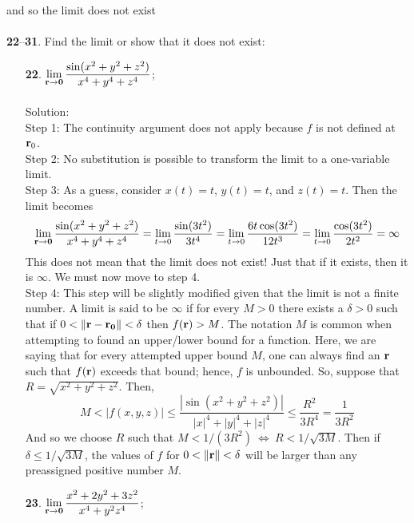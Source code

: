 \documentclass[12pt]{amsbook}
\begin{document}
and so the limit does not exist
\\
\\
{\small {\bf 22}--{\bf 31}}. Find the limit or show that it does not exist:
\begin{enumerate}
\item[{\small\bf 22}.] $\! \begin{aligned}[t]
\lim_{{\bf r} \rightarrow {\bf 0}} \frac{\sin(x^2+y^2+z^2)}{x^4+y^4+z^4}
\end{aligned}$;
\\
\\
{\sc Solution}:
\\
{\sf Step 1}: The continuity argument does not apply because $f$ is not defined at ${\bf r}_0$.
\\
{\sf Step 2}: No substitution is possible to transform the limit to a one-variable
limit.
\\
{\sf Step 3}: As a guess, consider $x(t)=t$, $y(t)=t$, and $z(t)=t$. Then the limit becomes
$$\lim_{{\bf r} \rightarrow {\bf 0}} \frac{\sin(x^2+y^2+z^2)}{x^4+y^4+z^4}=\lim_{t \rightarrow 0} \frac{\sin(3t^2)}{3t^4}=\lim_{t \rightarrow 0} \frac{6t\cos(3t^2)}{12t^3}=\lim_{t \rightarrow 0} \frac{\cos(3t^2)}{2t^2}=\infty$$
This does not mean that the limit does not exist! Just that if it exists, then it is $\infty$. We must now move to step 4.
\\
{\sf Step 4}: This step will be slightly modified given that the limit is not a finite number. A limit is said to be $\infty$ if for every $M>0$ there exists a $\delta>0$ such that if $0<\|{\bf r}-{\bf r_0}\|<\delta$ then $f({\bf r})>M$. The notation $M$ is common when attempting to found an upper/lower bound for a function. Here, we are saying that for every attempted upper bound $M$, one can always find an ${\bf r}$ such that $f({\bf r})$ exceeds that bound; hence, $f$ is unbounded. So, suppose that $R=\sqrt{x^2+y^2+z^2}$. Then,
$$M<|f(x,y,z)|\leq \frac{|\sin(x^2+y^2+z^2)|}{|x|^4+|y|^4+|z|^4}\leq \frac{R^2}{3R^4}=\frac{1}{3R^2}$$
And so we choose $R$ such that $M<1/(3R^2)  \ \Leftrightarrow \ R<1/\sqrt{3M}$. Then if $\delta \leq 1/\sqrt{3M}$, the values of $f$ for $0<\|{\bf r}\| < \delta$ will be larger than any preassigned positive number $M$.
\\
\item[{\small\bf 23}.] $\! \begin{aligned}[t]
\lim_{{\bf r} \rightarrow {\bf 0}} \frac{x^2+2y^2+3z^2}{x^4+y^2z^4}
\end{aligned}$;
\\

\end{enumerate}
\end{document}
